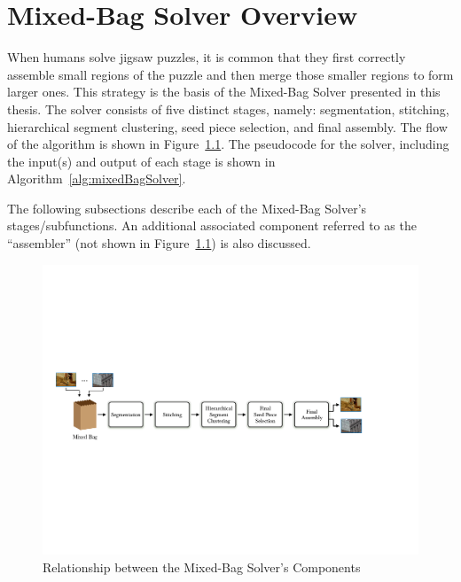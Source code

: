 \chapter{Mixed-Bag Solver Overview}\label{chap:mixedBagSolver}

When humans solve jigsaw puzzles, it is common that they first correctly assemble small regions of the puzzle and then merge those smaller regions to form larger ones.  This strategy is the basis of the Mixed-Bag Solver presented in this thesis.  The solver consists of five distinct stages, namely: segmentation, stitching, hierarchical segment clustering, seed piece selection, and final assembly.  The flow of the algorithm is shown in Figure~\ref{fig:multipuzzleSolverArchitecture}.  The pseudocode for the solver, including the input(s) and output of each stage is shown in Algorithm~\ref{alg:mixedBagSolver}. 

The following subsections describe each of the Mixed-Bag Solver's stages/subfunctions.  An additional associated component referred to as the ``assembler'' (not shown in Figure~\ref{fig:multipuzzleSolverArchitecture}) is also discussed.

\begin{figure}[ht!]
	\centering
		\includegraphics[width=1.0\textwidth]{images/cropped_algorithm_structure_overview.pdf}
	\caption{Relationship between the Mixed-Bag Solver's Components}\label{fig:multipuzzleSolverArchitecture}
\end{figure}

